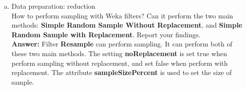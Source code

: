\documentclass[11pt, final]{article}
\begin{document}
\begin{enumerate}[(a)]
\begin{enumerate}[(i)]
\end{enumerate}

\item Data preparation: reduction \\
How to perform sampling with Weka filters? Can it perform the two main methods: \textbf{Simple Random Sample Without Replacement}, and \textbf{Simple Random Sample with Replacement}. Report your findings. \\

\textbf{Answer:} Filter \textbf{Resample} can perform sampling. It can perform both of these two main methods. The setting \textbf{noReplacement} is set true when perform sampling without replacement, and set false when perform with replacement. The attribute \textbf{sampleSizePercent} is used to set the size of sample. 

\end{enumerate}
\end{document}
